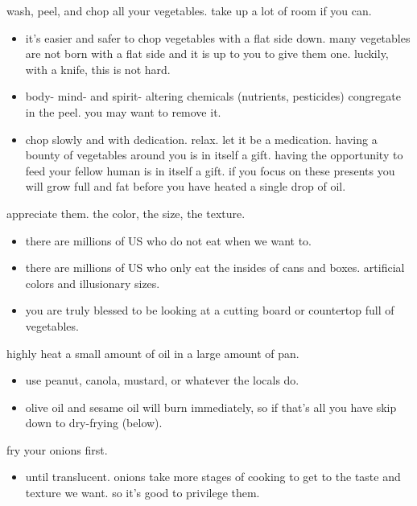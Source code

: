 \begin{algorithm}

  \item wash, peel, and chop all your vegetables. take up a lot of room if you 
  can.
  \begin{itemize}
    \item it's easier and safer to chop vegetables with a flat side down. many vegetables are not born with a flat side and it is up to you to give them one. luckily, with a knife, this is not hard.
    \item body- mind- and spirit- altering chemicals (nutrients, pesticides) congregate in the peel. you may want to remove it.
    \item chop slowly and with dedication. relax. let it be a medication. having a bounty of vegetables around you is in itself a gift. having the opportunity to feed your fellow human is in itself a gift. if you focus on these presents you will grow full and fat before you have heated a single drop of oil.
  \end{itemize}

  \item appreciate them. the color, the size, the texture.
  \begin{itemize}
    \item there are millions of US who do not eat when we want to.
    \item there are millions of US who only eat the insides of cans and boxes. artificial colors and illusionary sizes.
    \item you are truly blessed to be looking at a cutting board or countertop full of vegetables.
  \end{itemize}

  \item highly heat a small amount of oil in a large amount of pan.
  \begin{itemize}
    \item use peanut, canola, mustard, or whatever the locals do.
    \item olive oil and sesame oil will burn immediately, so if that's all you have skip down to dry-frying (below).
  \end{itemize}

  \item fry your onions first.
  \begin{itemize}
    \item until translucent. onions take more stages of cooking to get to the taste and texture we want. so it's good to privilege them.
  \end{itemize}
  

\end{algorithm}
